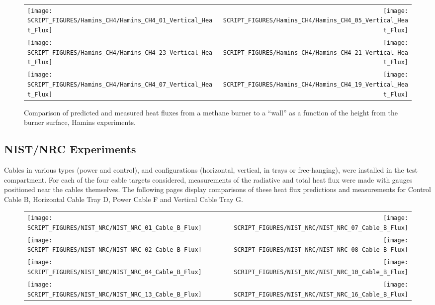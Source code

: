 \begin{figure}[p]
\begin{tabular*}{\textwidth}{l@{\extracolsep{\fill}}r}
\texttt{[image: SCRIPT\_FIGURES/Hamins\_CH4/Hamins\_CH4\_01\_Vertical\_Heat\_Flux]} &
\texttt{[image: SCRIPT\_FIGURES/Hamins\_CH4/Hamins\_CH4\_05\_Vertical\_Heat\_Flux]} \\
\texttt{[image: SCRIPT\_FIGURES/Hamins\_CH4/Hamins\_CH4\_23\_Vertical\_Heat\_Flux]} &
\texttt{[image: SCRIPT\_FIGURES/Hamins\_CH4/Hamins\_CH4\_21\_Vertical\_Heat\_Flux]} \\
\texttt{[image: SCRIPT\_FIGURES/Hamins\_CH4/Hamins\_CH4\_07\_Vertical\_Heat\_Flux]} &
\texttt{[image: SCRIPT\_FIGURES/Hamins\_CH4/Hamins\_CH4\_19\_Vertical\_Heat\_Flux]}
\end{tabular*}
\label{Hamins_CH4_Vertical}
\caption[Vertical heat flux predictions, Hamins methane burner experiments.]
{Comparison of predicted and measured heat fluxes from a methane burner to a ``wall'' as a function of the height from the burner surface, Hamins experiments.}
\end{figure}



\clearpage


\subsection{NIST/NRC Experiments}

Cables in various types (power and control), and configurations (horizontal, vertical, in trays or free-hanging), were installed in
the test compartment. For each of the four cable targets considered, measurements of the radiative and total heat flux were made with
gauges positioned near the cables themselves.  The following pages display comparisons of these heat flux predictions and measurements for
Control Cable B, Horizontal Cable Tray D, Power Cable F and Vertical Cable Tray G.

\newpage

\begin{figure}[p]
\begin{tabular*}{\textwidth}{l@{\extracolsep{\fill}}r}
\texttt{[image: SCRIPT\_FIGURES/NIST\_NRC/NIST\_NRC\_01\_Cable\_B\_Flux]} &
\texttt{[image: SCRIPT\_FIGURES/NIST\_NRC/NIST\_NRC\_07\_Cable\_B\_Flux]} \\
\texttt{[image: SCRIPT\_FIGURES/NIST\_NRC/NIST\_NRC\_02\_Cable\_B\_Flux]} &
\texttt{[image: SCRIPT\_FIGURES/NIST\_NRC/NIST\_NRC\_08\_Cable\_B\_Flux]} \\
\texttt{[image: SCRIPT\_FIGURES/NIST\_NRC/NIST\_NRC\_04\_Cable\_B\_Flux]} &
\texttt{[image: SCRIPT\_FIGURES/NIST\_NRC/NIST\_NRC\_10\_Cable\_B\_Flux]} \\
\texttt{[image: SCRIPT\_FIGURES/NIST\_NRC/NIST\_NRC\_13\_Cable\_B\_Flux]} &
\texttt{[image: SCRIPT\_FIGURES/NIST\_NRC/NIST\_NRC\_16\_Cable\_B\_Flux]}
\end{tabular*}
\label{NIST_NRC_Cable_B_Flux_Closed}
\end{figure}

